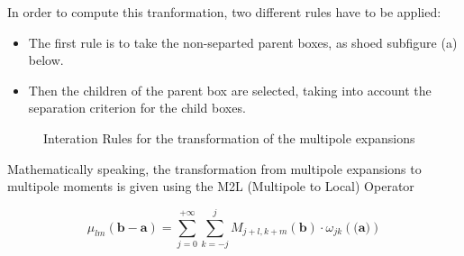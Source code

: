 \documentclass[12pt,twoside,a4paper]{report}
\begin{document}
	In order to compute this tranformation, two different rules have to be applied:
	
	\begin{itemize}
	
	\item The first rule is to take the non-separted parent boxes, as shoed subfigure (a) below.
	\item Then the children of the parent box are selected, taking into account the separation criterion for the child boxes.
	
	\end{itemize}	   
   
	 
 \begin{figure}[H]
    \centering 
    \caption{Interation Rules for the transformation of the multipole expansions}
    \label{fig:multipole}
   \end{figure}   
   
	  Mathematically speaking, the transformation from multipole expansions to multipole moments is given using the  M2L (Multipole to Local) Operator
	  
	  \begin{equation}
	  \mu_{lm}(\textbf{b} - \textbf{a}) = \sum\limits_{j = 0}^{+\infty} \sum\limits_{k=-j}^{j}
	  M_{j+l,k+m}(\textbf{b}) \cdot \omega_{jk}(\textbf{(a)})
	  \end{equation}
   
\end{document}
